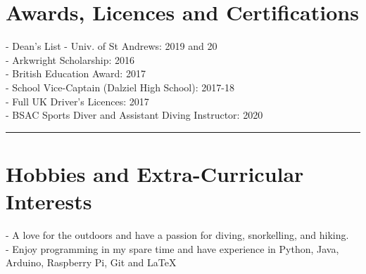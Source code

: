 %
%

\section*{Awards, Licences and Certifications}
\begin{multicols}{2}
 - Dean’s List - Univ. of St Andrews: 2019 and 20\\
 - Arkwright Scholarship: 2016\\
 - British Education Award: 2017\\
 - School Vice-Captain (Dalziel High School): 2017-18\\
 - Full UK Driver's Licences: 2017\\
 - BSAC Sports Diver and Assistant Diving Instructor: 2020
\end{multicols}

\noindent\rule[2ex]{\linewidth}{1pt}


\section*{Hobbies and Extra-Curricular Interests}
 - A love for the outdoors and have a passion for diving, snorkelling, and hiking.\\
 - Enjoy programming in my spare time and have experience in Python, Java, Arduino, Raspberry Pi, Git and \LaTeX


